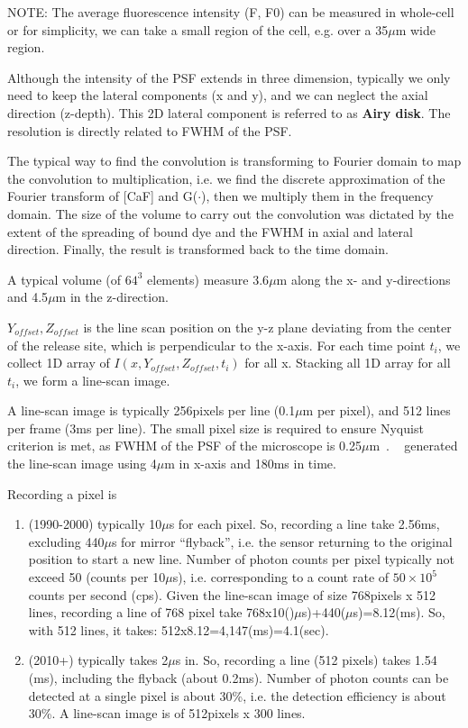 NOTE: The average fluorescence intensity (F, F0) can be measured in
whole-cell or for simplicity, we can take a small region of the cell,
e.g. over a 35$\mu$m wide region.

Although the intensity of the PSF extends in three dimension, typically we only
need to keep the lateral components (x and y), and we can neglect the axial
direction (z-depth). This 2D  lateral component is referred to as {\bf Airy
disk}. The resolution is directly related to FWHM of the PSF.


\begin{framed}
  The typical way to find the convolution is transforming to Fourier
  domain to map the convolution to multiplication, i.e. we find the
  discrete approximation of the Fourier transform of [CaF] and
  G($\cdot$), then we multiply them in the frequency domain. The size
  of the volume to carry out the convolution was dictated by the
  extent of the spreading of bound dye and the FWHM in axial and
  lateral direction.  Finally, the result is transformed back to the
  time domain.

  A typical volume (of $64^3$ elements) measure 3.6$\mu$m along the x-
  and y-directions and 4.5$\mu$m in the z-direction.
\end{framed}

$Y_{offset}, Z_{offset}$ is the line scan position on the y-z plane deviating
from the center of the release site, which is perpendicular to the x-axis. For
each time point $t_i$, we collect 1D array of $I(x,Y_{offset},Z_{offset},t_i)$ for all
x. Stacking all 1D array for all $t_i$, we form a line-scan image.

\begin{framed}
  A line-scan image is typically 256pixels per line (0.1$\mu$m per
  pixel), and 512 lines per frame (3ms per line). The small pixel size
  is required to ensure Nyquist criterion is met, as FWHM of the PSF
  of the microscope is 0.25$\mu$m~\citep{izu2001lcg}.
  ~\citep{izu1998} generated the line-scan image using 4$\mu$m in
  x-axis and 180ms in time.
\end{framed}

Recording a pixel is
\begin{enumerate}
  \item (1990-2000) typically 10$\mu$s for each pixel. So, recording a
line take 2.56ms, excluding 440$\mu$s for mirror ``flyback'', i.e. the
sensor returning to the original position to start a new line. Number
of photon counts per pixel typically not exceed 50 (counts per 10$\mu$s),
i.e. corresponding to a count rate of $50\times 10^5$ counts per
second (cps). Given the line-scan image of size 768pixels x 512 lines,
recording a line of 768 pixel take 768x10()$\mu$s)+440($\mu$s)=8.12(ms). So,
with 512 lines, it takes: 512x8.12=4,147(ms)=4.1(sec). 


  \item (2010+) typically takes 2$\mu$s in. So, recording a line (512 pixels)
  takes 1.54 (ms), including the flyback (about 0.2ms). Number of photon counts
  can be detected at a single pixel is about 30\%, i.e. the detection efficiency
  is about 30\%. A line-scan image is of 512pixels x 300 lines.
\end{enumerate}

